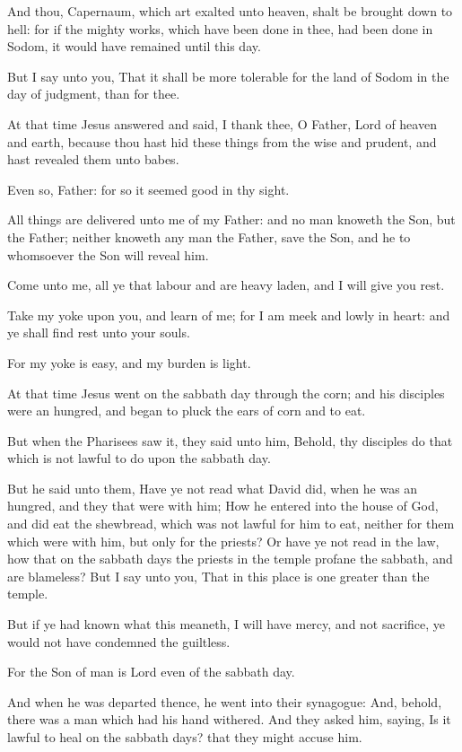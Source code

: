 \Verse And thou, Capernaum, which art exalted unto heaven, shalt be brought down to hell: for if the mighty works, which have been done in thee, had been done in Sodom, it would have remained until this day.

\Verse But I say unto you, That it shall be more tolerable for the land of Sodom in the day of judgment, than for thee.

\Verse At that time Jesus answered and said, I thank thee, O Father, Lord of heaven and earth, because thou hast hid these things from the wise and prudent, and hast revealed them unto babes.

\Verse Even so, Father: for so it seemed good in thy sight.

\Verse All things are delivered unto me of my Father: and no man knoweth the Son, but the Father; neither knoweth any man the Father, save the Son, and he to whomsoever the Son will reveal him.

\Verse Come unto me, all ye that labour and are heavy laden, and I will give you rest.

\Verse Take my yoke upon you, and learn of me; for I am meek and lowly in heart: and ye shall find rest unto your souls.

\Verse For my yoke is easy, and my burden is light.


\Chapter
\Verse At that time Jesus went on the sabbath day through the corn; and his disciples were an hungred, and began to pluck the ears of corn and to eat.

\Verse But when the Pharisees saw it, they said unto him, Behold, thy disciples do that which is not lawful to do upon the sabbath day.

\Verse But he said unto them, Have ye not read what David did, when he was an hungred, and they that were with him; \Verse How he entered into the house of God, and did eat the shewbread, which was not lawful for him to eat, neither for them which were with him, but only for the priests?  \Verse Or have ye not read in the law, how that on the sabbath days the priests in the temple profane the sabbath, and are blameless?  \Verse But I say unto you, That in this place is one greater than the temple.

\Verse But if ye had known what this meaneth, I will have mercy, and not sacrifice, ye would not have condemned the guiltless.

\Verse For the Son of man is Lord even of the sabbath day.

\Verse And when he was departed thence, he went into their synagogue: \Verse And, behold, there was a man which had his hand withered. And they asked him, saying, Is it lawful to heal on the sabbath days? that they might accuse him.

